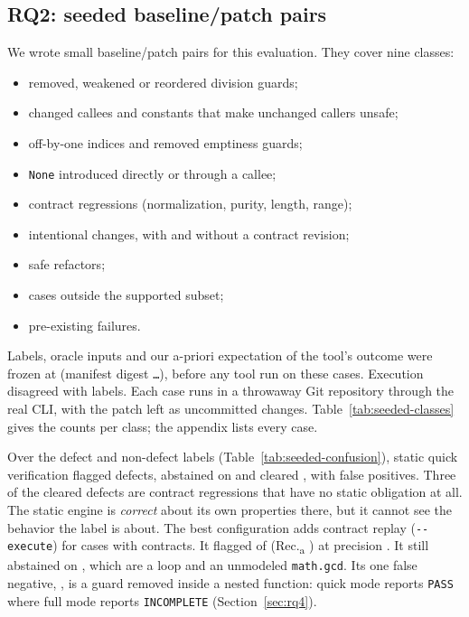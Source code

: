 \documentclass[10pt,twocolumn]{article}
\newcommand{\opt}[1]{\texttt{-{}-#1}}
\newcommand{\res}[1]{\texttt{\small #1}}
\begin{document}


\subsection{RQ2: seeded baseline/patch pairs}
\label{sec:rq2}

We wrote \SeedCases{} small baseline/patch pairs for this evaluation. They cover nine classes:
\begin{itemize}
\item removed, weakened or reordered division guards;
\item changed callees and constants that make unchanged callers unsafe;
\item off-by-one indices and removed emptiness guards;
\item \texttt{None} introduced directly or through a callee;
\item contract regressions (normalization, purity, length, range);
\item intentional changes, with and without a contract revision;
\item safe refactors;
\item cases outside the supported subset;
\item pre-existing failures.
\end{itemize}
Labels, oracle inputs and our a-priori expectation of the tool's outcome were frozen at \SeedLabelsFrozen{} (manifest
digest \texttt{\SeedManifestDigest\ldots}), before any tool run on these cases. Execution disagreed with
\SeedDisagree{} labels. Each case runs in a throwaway Git repository through the real CLI, with the patch left as
uncommitted changes. Table~\ref{tab:seeded-classes} gives the counts per class; the appendix lists every case.



Over the \SeedPos{} defect and \SeedNeg{} non-defect labels (Table~\ref{tab:seeded-confusion}), static quick
verification flagged \SeedQuickTP{} defects, abstained on \SeedQuickAbstPos{} and cleared \SeedQuickFN{}, with
\SeedQuickFP{} false positives. Three of the cleared defects are contract regressions that have no static obligation at
all. The static engine is \emph{correct} about its own properties there, but it cannot see the behavior the label is
about. The best configuration adds contract replay (\opt{execute}) for cases with contracts. It flagged \SeedBestTP{} of
\SeedPos{} (Rec.\textsubscript{a} \SeedBestRecA{}) at precision \SeedBestPrec{}. It still abstained on
\SeedAbstPosCases{}, which are a loop and an unmodeled \texttt{math.gcd}. Its one false negative, \SeedFalseNegCases{},
is a guard removed inside a nested function: quick mode reports \res{PASS} where full mode reports \res{INCOMPLETE}
(Section~\ref{sec:rq4}).
\end{document}
